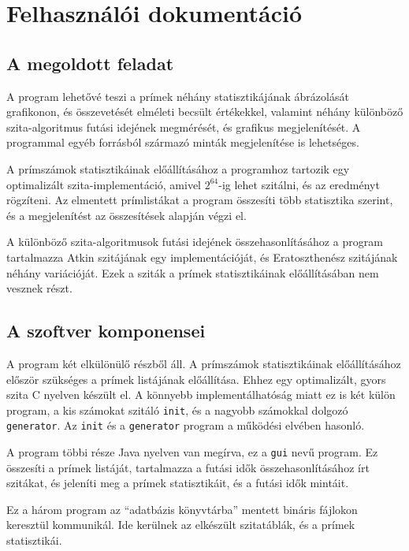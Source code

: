 \chapter{Felhasználói dokumentáció}

\section{A megoldott feladat}

A program lehetővé teszi a prímek néhány statisztikájának ábrázolását grafikonon,
és összevetését elméleti becsült értékekkel, valamint néhány különböző szita-algoritmus
futási idejének megmérését, és grafikus megjelenítését.
A programmal egyéb forrásból származó minták megjelenítése is lehetséges.

A prímszámok statisztikáinak előállításához a programhoz tartozik egy optimalizált
szita-implementáció, amivel $2^{64}$-ig lehet szitálni, és az eredményt rögzíteni.
Az elmentett prímlistákat a program összesíti több statisztika szerint, és a megjelenítést az összesítések alapján végzi el.

A különböző szita-algoritmusok futási idejének összehasonlításához a program tartalmazza
Atkin\cite{atkin} szitájának egy implementációját, és Eratoszthenész szitájának néhány variációját. Ezek a sziták a prímek statisztikáinak előállításában nem vesznek részt.

\section{A szoftver komponensei}

A program két elkülönülő részből áll.
A prímszámok statisztikáinak előállításához először szükséges a prímek listájának előállítása.
Ehhez egy optimalizált, gyors szita C nyelven készült el.
A könnyebb implementálhatóság miatt ez is két külön program, a kis számokat szitáló \texttt{init}, és a nagyobb számokkal dolgozó \texttt{generator}.
Az \texttt{init} és a \texttt{generator} program a működési elvében hasonló.

A program többi része Java nyelven van megírva, ez a \texttt{gui} nevű program.
Ez összesíti a prímek listáját, tartalmazza a futási idők összehasonlításához írt szitákat, és jeleníti meg a prímek statisztikáit, és a futási idők mintáit.

Ez a három program az ``adatbázis könyvtárba'' mentett bináris fájlokon keresztül kommunikál.
Ide kerülnek az elkészült szitatáblák, és a prímek statisztikái.

